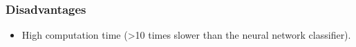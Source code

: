 \documentclass[10pt]{article}
\begin{document}
\subsubsection{Disadvantages}
\begin{itemize}
\item High computation time (>10 times slower than the neural network classifier).


\end{itemize}

 

\end{document}
